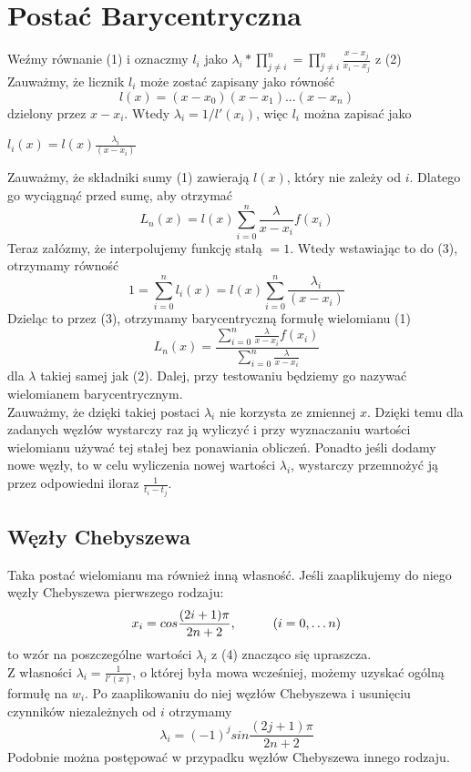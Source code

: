 \documentclass[11pt, wide]{article}
\begin{document}
\section{Postać Barycentryczna}
Weźmy równanie (1) i oznaczmy $l_i$ jako $\lambda_i *\prod_{j\neq i}^{n} = \prod_{j\neq i}^{n}\frac{x - x_j}{x_i - x_j} $ z (2)
\\ Zauważmy, że licznik $l_i$ może zostać zapisany jako równość
\begin{equation*}
    l(x) = (x - x_0)(x - x_1)\ldots(x - x_n)
\end{equation*} 
dzielony przez $x - x_i$. Wtedy $\lambda_i = 1/l'(x_i)$, więc $l_i$ można zapisać jako
\begin{center}
    $l_i(x) = l(x)\frac{\lambda_i}{(x - x_i)}$
\end{center}
Zauważmy, że składniki sumy (1) zawierają $l(x)$, który nie zależy od $i$. Dlatego go
wyciągnąć przed sumę, aby otrzymać
\begin{equation}
    L_n(x) = l(x)\sum_{i=0}^{n}\frac{\lambda}{x - x_i}f(x_i)
\end{equation}
Teraz załózmy, że interpolujemy funkcję stałą $ = 1$. Wtedy wstawiając to do (3),
otrzymamy równość                           
\begin{equation*}
    1 = \sum_{i=0}^{n}l_i(x) = l(x)\sum_{i=0}^{n}\frac{\lambda_i}{(x - x_i)}
\end{equation*}
Dzieląc to przez (3), otrzymamy \textsf{barycentryczną formułę} wielomianu (1)
\begin{equation}
    L_n(x) = \frac{\sum_{i=0}^{n}\frac{\lambda}{x - x_i}f(x_i)}{\sum_{i=0}^{n}\frac{\lambda}{x - x_i}}
\end{equation}
dla $\lambda$ takiej samej jak (2). Dalej, przy testowaniu będziemy go nazywać 
\textsf{wielomianem barycentrycznym}.
\\

Zauważmy, że dzięki takiej postaci $\lambda_i$ nie korzysta ze zmiennej $x$.
Dzięki temu dla zadanych węzłów wystarczy raz ją wyliczyć i przy wyznaczaniu wartości
wielomianu używać tej stałej bez ponawiania obliczeń. Ponadto jeśli 
dodamy nowe węzły, to w celu wyliczenia nowej wartości $\lambda_i$, wystarczy
przemnożyć ją przez odpowiedni iloraz $\frac{1}{t_i - t_j}$.
\subsection{Węzły Chebyszewa}
Taka postać wielomianu ma również inną własność. Jeśli zaaplikujemy
do niego węzły Chebyszewa pierwszego rodzaju:
\begin{equation}
x_i = cos\frac{(2i + 1)\pi}{2n + 2}, \hspace*{1cm} (i = 0, \ldots n)
\end{equation}
to wzór na poszczególne wartości $\lambda_i$ z (4) znacząco się upraszcza.
\\
Z własności $\lambda_i = \frac{1}{l'(x)}$, o której była mowa wcześniej, możemy
uzyskać ogólną formułę na $w_i$.
Po zaaplikowaniu do niej węzłów Chebyszewa i usunięciu czynników 
niezależnych od $i$ otrzymamy
\begin{equation}
    \lambda_i = (-1)^j sin\frac{(2j + 1)\pi}{2n + 2}
\end{equation}
Podobnie można postępować w przypadku węzłów Chebyszewa innego rodzaju.
\end{document}

